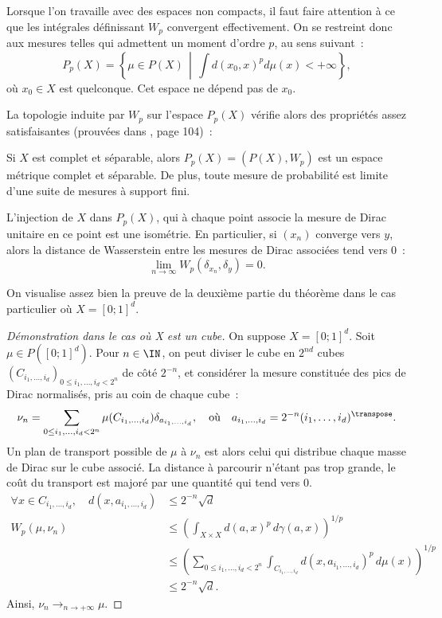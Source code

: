 Lorsque l'on travaille avec des espaces non compacts, il faut faire attention à ce que les intégrales définissant $W_p$ convergent effectivement. On se restreint donc aux mesures telles qui admettent un \og moment d'ordre $p$\fg, au sens suivant~:
\[P_p(X) = \left\{\mu \in P(X)\,\middle|\, \int d(x_0,x)^p d\mu(x) < +\infty \right\} , \]
où $x_0 \in X$ est quelconque. Cet espace ne dépend pas de $x_0$.

La topologie induite par $W_p$ sur l'espace $P_p(X)$ vérifie alors des propriétés assez satisfaisantes (prouvées dans \cite{villani08}, page 104)~: 
\begin{theoreme}
Si $X$ est complet et séparable, alors $P_p(X) = (P(X),W_p)$ est un espace métrique complet et séparable. De plus, toute mesure de probabilité est limite d'une suite de mesures à support fini.
\end{theoreme}
\begin{remarque}
L'injection de $X$ dans $P_p(X)$, qui à chaque point associe la mesure de Dirac unitaire en ce point est une isométrie. En particulier, si $(x_n)$ converge vers $y$, alors la distance de Wasserstein entre les mesures de Dirac associées tend vers 0~:
\[\lim_{n \rightarrow \infty} W_p(\delta_{x_n},\delta_y) = 0. \]
\end{remarque}

On visualise assez bien la preuve de la deuxième partie du théorème dans le cas particulier où $X = [0;1]^d$.
\begin{proof}[Démonstration dans le cas où X est un cube]
On suppose $X = [0;1]^d$.
Soit $\mu \in P([0;1]^d)$. Pour $n \in \IN$, on peut diviser le cube en $2^{nd}$ cubes $(C_{i_1,\ldots,i_d})_{0 \le i_1,\ldots,i_d < 2^n}$ de côté $2^{-n}$, et considérer la mesure constituée des pics de Dirac normalisés, pris au coin de chaque cube~:
\[\nu_n = \sum_{0 \le i_1,\ldots,i_d < 2^n} \mu(C_{i_1,\ldots,i_d}) \delta_{a_{i_1,\ldots,i_d}} ,
\quad \text{où} \quad
a_{i_1,\ldots,i_d} = 2^{-n}(i_1,\ldots,i_d)^\transpose .\]
Un plan de transport possible de $\mu$ à $\nu_n$ est alors celui qui distribue chaque masse de Dirac sur le cube associé. La distance à parcourir n'étant pas trop grande, le coût du transport est majoré par une quantité qui tend vers 0.
\[
\begin{split}
\forall x \in C_{i_1,\ldots,i_d},\quad d(x,a_{i_1,\ldots,i_d}) & \le 2^{-n} \sqrt{d} \\
W_p(\mu,\nu_n) &\le \left(\int_{X\times X} d(a,x)^p\,d\gamma(a,x)\right)^{1/p} \\
&\le \left(\sum_{0 \le i_1,\ldots,i_d < 2^n} \int_{C_{i_1,\ldots,i_d}} d(x,a_{i_1,\ldots,i_d})^p \, d\mu (x) \right)^{1/p} \\
& \le 2^{-n}\sqrt{d} .
\end{split}
\]
Ainsi, $\nu_n \rightarrow_{n \rightarrow +\infty} \mu$.
\end{proof}

